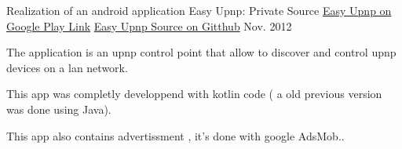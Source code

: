 \documentclass[11pt, a4paper]{awesome-cv} %
\begin{document}
\begin{cventries}
    \cventry
    {Realization of an android application } %
    {Easy Upnp: Private Source} %
    { \href{https://play.google.com/store/apps/details?id=com.easysoftin.easyup}{Easy Upnp on Google Play Link} } %
    { \href{https://bitbucket.org/easysoftin/easyup/src/master/}{Easy Upnp Source on Gitthub} } %
    {Nov. 2012} %
    { %
        \begin{cvitems}
            \item {The application is an upnp control point that allow to discover and control upnp devices on a lan network.}
            \item {This app was completly developpend with kotlin code ( a old previous version was done using Java).}
            \item {This app also contains advertissment , it's done with google AdsMob..}
        \end{cvitems}
    }

\end{cventries}
\end{document}
